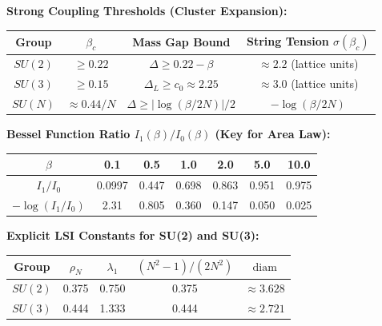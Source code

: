 \begin{tcolorbox}[colback=green!5!white,colframe=green!75!black,title=\textbf{Explicit Numerical Values: Strong Coupling Thresholds}]

\textbf{Strong Coupling Thresholds (Cluster Expansion):}
\begin{center}
\renewcommand{\arraystretch}{1.3}
\begin{tabular}{|c|c|c|c|}
\hline
\textbf{Group} & $\beta_c$ & \textbf{Mass Gap Bound} & \textbf{String Tension $\sigma(\beta_c)$} \\
\hline
$SU(2)$ & $\geq 0.22$ & $\Delta \geq 0.22 - \beta$ & $\approx 2.2$ (lattice units) \\
\hline
$SU(3)$ & $\geq 0.15$ & $\Delta_L \geq c_0 \approx 2.25$ & $\approx 3.0$ (lattice units) \\
\hline
$SU(N)$ & $\approx 0.44/N$ & $\Delta \geq |\log(\beta/2N)|/2$ & $-\log(\beta/2N)$ \\
\hline
\end{tabular}
\end{center}

\textbf{Bessel Function Ratio $I_1(\beta)/I_0(\beta)$ (Key for Area Law):}
\begin{center}
\begin{tabular}{|c|c|c|c|c|c|c|}
\hline
$\beta$ & 0.1 & 0.5 & 1.0 & 2.0 & 5.0 & 10.0 \\
\hline
$I_1/I_0$ & 0.0997 & 0.447 & 0.698 & 0.863 & 0.951 & 0.975 \\
\hline
$-\log(I_1/I_0)$ & 2.31 & 0.805 & 0.360 & 0.147 & 0.050 & 0.025 \\
\hline
\end{tabular}
\end{center}

\textbf{Explicit LSI Constants for SU(2) and SU(3):}
\begin{center}
\begin{tabular}{|c|c|c|c|c|}
\hline
\textbf{Group} & $\rho_N$ & $\lambda_1$ & $(N^2-1)/(2N^2)$ & $\mathrm{diam}$ \\
\hline
$SU(2)$ & 0.375 & 0.750 & 0.375 & $\approx 3.628$ \\
\hline
$SU(3)$ & 0.444 & 1.333 & 0.444 & $\approx 2.721$ \\
\hline
\end{tabular}
\end{center}
\end{tcolorbox}

